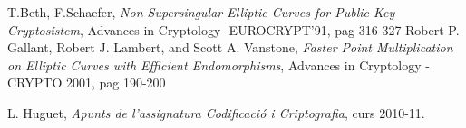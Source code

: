 \documentclass[journal]{IEEEtran}
\begin{document}
\ifCLASSOPTIONcaptionsoff
 \newpage
\fi





%
%
%
\begin{thebibliography}{1}

T.Beth, F.Schaefer,  \emph{Non Supersingular Elliptic Curves for Public Key Cryptosistem}, Advances in Cryptology- EUROCRYPT'91, pag 316-327
Robert P. Gallant, Robert J. Lambert, and Scott A. Vanstone, \emph{Faster Point Multiplication on Elliptic Curves with Efficient Endomorphisms},  Advances in Cryptology - CRYPTO 2001, pag 190-200

L. Huguet, \emph{Apunts de l'assignatura Codificació i Criptografia}, curs 2010-11.
\end{thebibliography}

% 
\end{document}

